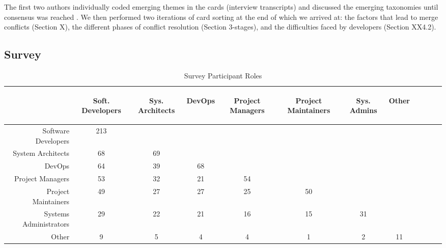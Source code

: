The first two authors individually coded emerging themes in the cards (interview transcripts) and discussed the emerging taxonomies until consensus was reached \cite{card_sort}. We then performed two iterations of card sorting at the end of which we arrived at: the factors that lead to merge conflicts (Section X), the different phases of conflict resolution (Section 3-stages), and the difficulties faced by developers (Section XX4.2).


\subsection{Survey}

\begin{table}
\renewcommand{\arraystretch}{1.3}
\caption{Survey Participant Roles}
\label{survey_roles}
\centering
\begin{tabularx}{0.45\textwidth}{@{}r*{10}{C}c@{}}
\toprule
\addlinespace[5.4em]
	& \begin{rotate}{45} Soft. Developers \end{rotate} 
	& \begin{rotate}{45} Sys. Architects \end{rotate} 
	& \begin{rotate}{45} DevOps \end{rotate} 
	& \begin{rotate}{45} Project Managers \end{rotate}
	& \begin{rotate}{45} Project Maintainers \end{rotate}
	& \begin{rotate}{45} Sys. Admins \end{rotate}
	& \begin{rotate}{45} Other \end{rotate}\\
\midrule
	Software Developers & 213 & & & & & & \\
	System Architects & 68 & 69 & & & & & \\
	DevOps & 64 & 39 & 68 & & & & \\
	Project Managers & 53 & 32 & 21 & 54 & & & \\
	Project Maintainers & 49 & 27 & 27 & 25 & 50 & & \\
	Systems Administrators & 29 & 22 & 21 & 16 & 15 & 31 & \\
	Other & 9 & 5 & 4 & 4 & 1 & 2 & 11 \\
\bottomrule
\end{tabularx}
\end{table}


